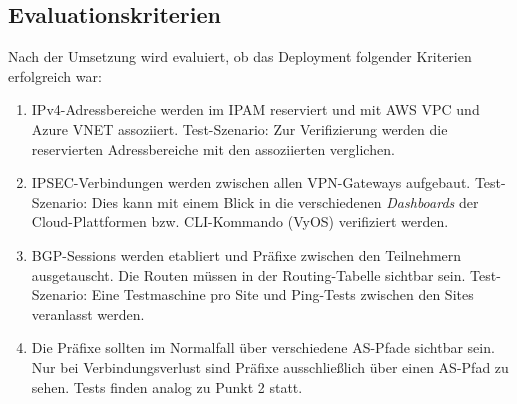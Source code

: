 
\subsection{Evaluationskriterien}
Nach der Umsetzung wird evaluiert, ob das Deployment folgender Kriterien erfolgreich war:
\begin{enumerate}
    \item IPv4-Adressbereiche werden im IPAM reserviert und mit AWS VPC und Azure VNET assoziiert. Test-Szenario: Zur Verifizierung werden die reservierten Adressbereiche mit den assoziierten verglichen.
    \item IPSEC-Verbindungen werden zwischen allen VPN-Gateways aufgebaut. Test-Szenario: Dies kann mit einem Blick in die verschiedenen \textit{Dashboards} der Cloud-Plattformen bzw. CLI-Kommando (VyOS) verifiziert werden.
    \item BGP-Sessions werden etabliert und Präfixe zwischen den Teilnehmern ausgetauscht. Die Routen müssen in der Routing-Tabelle sichtbar sein. Test-Szenario: Eine Testmaschine pro Site und Ping-Tests zwischen den Sites veranlasst werden.
    \item Die Präfixe sollten im Normalfall über verschiedene AS-Pfade sichtbar sein. Nur bei Verbindungsverlust sind Präfixe ausschließlich über einen AS-Pfad zu sehen. Tests finden analog zu Punkt 2 statt.
\end{enumerate}